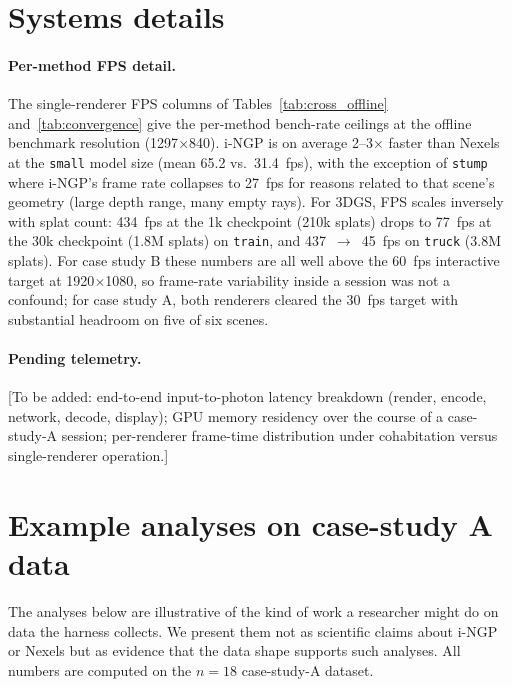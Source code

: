 
\appendix

\section{Systems details}
\label{app:systems}

\paragraph{Per-method FPS detail.} The single-renderer FPS columns of
Tables~\ref{tab:cross_offline} and~\ref{tab:convergence} give the
per-method bench-rate ceilings at the offline benchmark resolution
(1297$\times$840). i-NGP is on average 2--3$\times$ faster than Nexels
at the \texttt{small} model size (mean 65.2 vs.\ 31.4~fps), with the
exception of \texttt{stump} where i-NGP's frame rate collapses to
27~fps for reasons related to that scene's geometry (large depth
range, many empty rays). For 3DGS, FPS scales inversely with splat
count: 434~fps at the 1k checkpoint (210k splats) drops to 77~fps at
the 30k checkpoint (1.8M splats) on \texttt{train}, and
437~$\to$~45~fps on \texttt{truck} (3.8M splats). For case study B
these numbers are all well above the 60~fps interactive target at
1920$\times$1080, so frame-rate variability inside a session was not
a confound; for case study A, both renderers cleared the 30~fps
target with substantial headroom on five of six scenes.

\paragraph{Pending telemetry.} [To be added: end-to-end input-to-photon
latency breakdown (render, encode, network, decode, display); GPU
memory residency over the course of a case-study-A session; per-renderer
frame-time distribution under cohabitation versus single-renderer
operation.]

\section{Example analyses on case-study A data}
\label{app:analyses}

The analyses below are illustrative of the kind of work a researcher
might do on data the harness collects. We present them not as
scientific claims about i-NGP or Nexels but as evidence that the data
shape supports such analyses. All numbers are computed on the $n=18$
case-study-A dataset.

